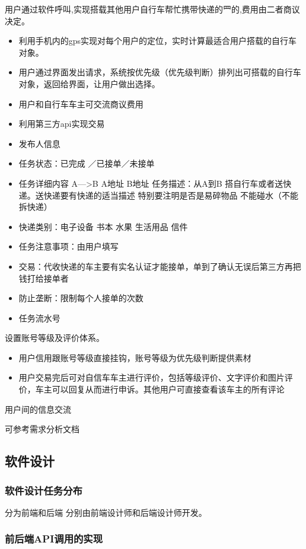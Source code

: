 \documentclass[UTF8]{dingo}
\begin{document}
      用户通过软件呼叫,实现搭载其他用户自行⻋帮忙携带快递的⺫的,费用由二者商议决定。
      \begin{itemize}
        \item 利用手机内的gps实现对每个用户的定位，实时计算最适合用户搭载的自行车对象。
        \item 用户通过界面发出请求，系统按优先级（优先级判断）排列出可搭载的自行车对象，返回给界面，让用户做出选择。
        \item 用户和自行车车主可交流商议费用
        \item 利用第三方api实现交易
        \item 发布人信息
        \item 任务状态：已完成 ／已接单／未接单
        \item 任务详细内容 A—>B A地址 B地址 任务描述：从A到B 搭自行车或者送快递。送快递要有快递的适当描述 特别要注明是否是易碎物品 不能碰水（不能拆快递）
        \item 快递类别：电子设备 书本 水果 生活用品 信件
        \item 任务注意事项：由用户填写
        \item 交易：代收快递的车主要有实名认证才能接单，单到了确认无误后第三方再把钱打给接单者
        \item 防止垄断：限制每个人接单的次数
        \item 任务流水号
      \end{itemize}

      设置账号等级及评价体系。
      \begin{itemize}
        \item 用户信用跟账号等级直接挂钩，账号等级为优先级判断提供素材
        \item 用户交易完后可对自信车车主进行评价，包括等级评价、文字评价和图片评价，车主可以回复从而进行申诉。其他用户可直接查看该车主的所有评论
      \end{itemize}

      用户间的信息交流

      可参考需求分析文档
    \subsection{软件设计}
      \subsubsection{软件设计任务分布}
        分为前端和后端 分别由前端设计师和后端设计师开发。
      \subsubsection{前后端API调用的实现}
\end{document}
